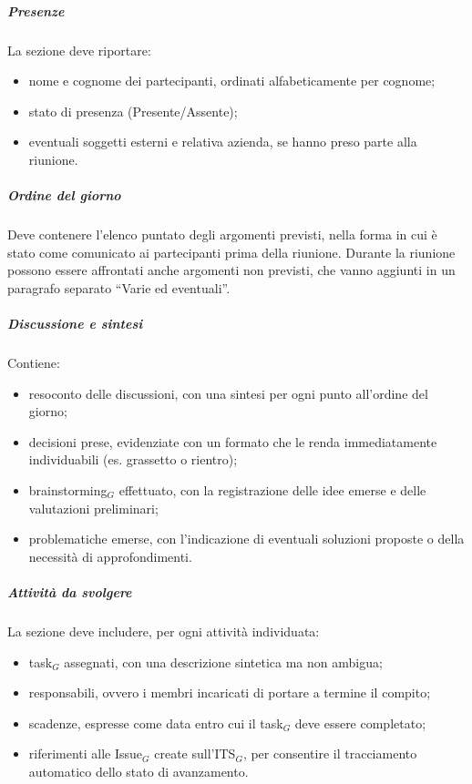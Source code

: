 \documentclass[a4paper, 10pt]{article}
\begin{document}
\subparagraph{Presenze}

La sezione deve riportare:
\begin{itemize}
    \item nome e cognome dei partecipanti, ordinati alfabeticamente per cognome;
    \item stato di presenza (Presente/Assente);
    \item eventuali soggetti esterni e relativa azienda, se hanno preso parte alla riunione.
\end{itemize}

\subparagraph{Ordine del giorno}

Deve contenere l'elenco puntato degli argomenti previsti, nella forma in cui è stato come comunicato ai partecipanti prima della riunione. Durante la riunione possono essere affrontati anche argomenti non previsti, che vanno aggiunti in un paragrafo separato “Varie ed eventuali”.

\subparagraph{Discussione e sintesi}

Contiene:
\begin{itemize}
    \item resoconto delle discussioni, con una sintesi per ogni punto all'ordine del giorno;
    \item decisioni prese, evidenziate con un formato che le renda immediatamente individuabili (es. grassetto o rientro);
    \item brainstorming$_G$ effettuato, con la registrazione delle idee emerse e delle valutazioni preliminari;
    \item problematiche emerse, con l'indicazione di eventuali soluzioni proposte o della necessità di approfondimenti.
\end{itemize}

\subparagraph{Attività da svolgere}

La sezione deve includere, per ogni attività individuata:
\begin{itemize}
    \item task$_G$ assegnati, con una descrizione sintetica ma non ambigua;
    \item responsabili, ovvero i membri incaricati di portare a termine il compito;
    \item scadenze, espresse come data entro cui il task$_G$ deve essere completato;
    \item riferimenti alle Issue$_G$ create sull'ITS$_G$, per consentire il tracciamento automatico dello stato di avanzamento.
\end{itemize}
\end{document}
